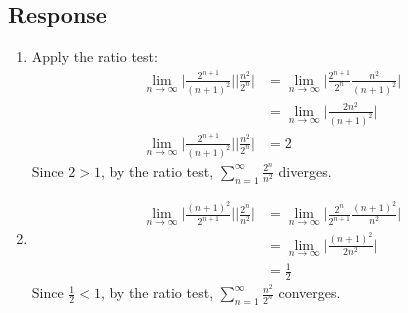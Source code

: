 \documentclass[13pt]{article}
\begin{document}
\subsection*{Response}
\begin{enumerate}[label=(\alph*)]
\item Apply the ratio test:
  \begin{align*}
    \lim_{n \rightarrow \infty} \bigg|\frac{2^{n + 1}}{(n + 1)^2}\bigg|
    \bigg|\frac{n^2}{2^n}\bigg| &= \lim_{n \rightarrow \infty} \bigg|
                                  \frac{2^{n + 1}}{2^n} \frac{n^2}{(n
                                  + 1)^2}\bigg| \\
                                &= \lim_{n \rightarrow \infty} \bigg|
                                  \frac{2n^2}{(n + 1)^2} \bigg| \\
    \lim_{n \rightarrow \infty} \bigg|\frac{2^{n + 1}}{(n + 1)^2}\bigg|
    \bigg|\frac{n^2}{2^n}\bigg|  &= 2
  \end{align*}
  Since $2 > 1$, by the ratio test, $\sum_{n = 1}^{\infty} \frac{2^n}{n^2}$ diverges.

\item
  \begin{align*}
    \lim_{n \rightarrow \infty} \bigg|\frac{(n + 1)^2}{2^{n + 1}}\bigg|
    \bigg|\frac{2^n}{n^2}\bigg| &= \lim_{n \rightarrow \infty} \bigg|
                                  \frac{2^{n}}{2^{n + 1}} \frac{(n
                                  + 1)^2}{n^2}\bigg| \\
                                &= \lim_{n \rightarrow \infty} \bigg|
                                  \frac{(n + 1)^2}{2n^2} \bigg| \\
                                &= \frac{1}{2}
  \end{align*}
  Since $\frac{1}{2} < 1$, by the ratio test, $\sum_{n = 1}^{\infty}
  \frac{n^2}{2^n}$ converges.
  

\end{enumerate}
\end{document}
